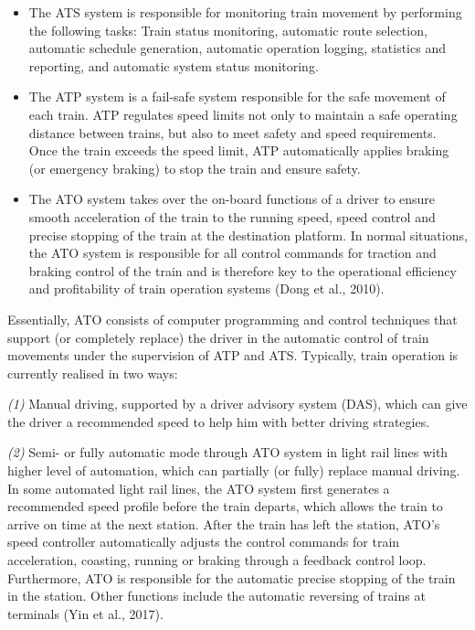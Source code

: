 \documentclass[
]{book}
\providecommand{\tightlist}{%
  \setlength{\itemsep}{0pt}\setlength{\parskip}{0pt}}
\begin{document}
\begin{itemize}
\tightlist
\item
  The ATS system is responsible for monitoring train movement by performing the following tasks: Train status monitoring, automatic route selection, automatic schedule generation, automatic operation logging, statistics and reporting, and automatic system status monitoring.
\item
  The ATP system is a fail-safe system responsible for the safe movement of each train. ATP regulates speed limits not only to maintain a safe operating distance between trains, but also to meet safety and speed requirements. Once the train exceeds the speed limit, ATP automatically applies braking (or emergency braking) to stop the train and ensure safety.
\item
  The ATO system takes over the on-board functions of a driver to ensure smooth acceleration of the train to the running speed, speed control and precise stopping of the train at the destination platform. In normal situations, the ATO system is responsible for all control commands for traction and braking control of the train and is therefore key to the operational efficiency and profitability of train operation systems (Dong et al., 2010).
\end{itemize}

Essentially, ATO consists of computer programming and control techniques that support (or completely replace) the driver in the automatic control of train movements under the supervision of ATP and ATS. Typically, train operation is currently realised in two ways:

\emph{(1)} Manual driving, supported by a driver advisory system (DAS), which can give the driver a recommended speed to help him with better driving strategies.

\emph{(2)} Semi- or fully automatic mode through ATO system in light rail lines with higher level of automation, which can partially (or fully) replace manual driving. In some automated light rail lines, the ATO system first generates a recommended speed profile before the train departs, which allows the train to arrive on time at the next station. After the train has left the station, ATO's speed controller automatically adjusts the control commands for train acceleration, coasting, running or braking through a feedback control loop. Furthermore, ATO is responsible for the automatic precise stopping of the train in the station. Other functions include the automatic reversing of trains at terminals (Yin et al., 2017).
\end{document}
